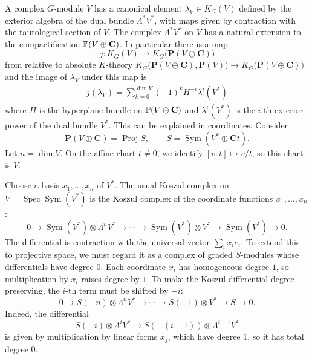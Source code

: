 \documentclass[12pt]{article}
\begin{document}
A complex $G$-module $V$ has a canonical element $\lambda_V\in K_G(V)$ defined by the exterior algebra of the dual bundle $\Lambda^*V^*$, with maps given by contraction with the tautological section of $V$. The complex $\Lambda^*V^*$ on $V$ has a natural extension to the compactification $\P(V\oplus\mathbf C)$. In particular there is a map \[
j:K_G(V)\longrightarrow K_G\bigl(\mathbf P(V\oplus\mathbf C)\bigr)\]
from relative to absolute $K$-theory $K_G\bigl(\mathbf P(V\oplus\mathbf C),\mathbf P(V)\bigr)
\longrightarrow
K_G\bigl(\mathbf P(V\oplus\mathbf C)\bigr)$ and the image of $\lambda_V$ under this map is \begin{align*}
    j(\lambda_V) = \sum_{k=0}^{\dim V}(-1)^k H^{-i} \lambda^i(V^*)
\end{align*} where $H$ is the hyperplane bundle on $\P(V\oplus\mathbf C)$ and $\lambda^i(V^*)$ is the $i$-th exterior power of the dual bundle $V^*$. This can be explained in coordinates. 
Consider
\[
\mathbf P(V\oplus\mathbf C) = \operatorname{Proj} S,
\qquad
S = \operatorname{Sym}(V^*\oplus\mathbf C t).
\]
Let $n=\dim V$. On the affine chart $t\neq 0$, we identify $[v:t]\mapsto v/t$, so this
chart is $V$.

Choose a basis $x_1,\dots,x_n$ of $V^*$. The usual Koszul complex on
$V=\operatorname{Spec}\operatorname{Sym}(V^*)$ is the Koszul complex of the coordinate
functions $x_1,\dots,x_n$:
\[
0\to \operatorname{Sym}(V^*)\otimes\Lambda^nV^* \to\cdots\to
\operatorname{Sym}(V^*)\otimes V^* \to \operatorname{Sym}(V^*) \to 0.
\]
The differential is contraction with the universal vector $\sum_i x_ie_i$. To extend this to projective space, we must regard it as a complex of graded $S$-modules
whose differentials have degree $0$. Each coordinate $x_i$ has homogeneous degree $1$, so
multiplication by $x_i$ raises degree by $1$. To make the Koszul differential
degree-preserving, the $i$-th term must be shifted by $-i$:
\[
0\to S(-n)\otimes\Lambda^nV^* \to\cdots\to S(-1)\otimes V^* \to S\to 0.
\]
Indeed, the differential
\[
S(-i)\otimes\Lambda^iV^* \longrightarrow S(-(i-1))\otimes\Lambda^{i-1}V^*
\]
is given by multiplication by linear forms $x_j$, which have degree $1$, so it has total
degree $0$.
\end{document}
